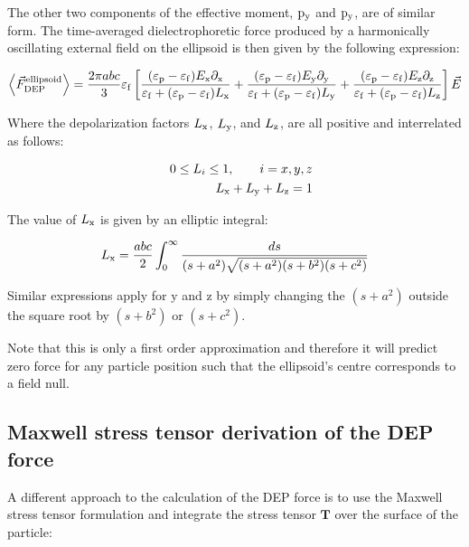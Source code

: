 \documentclass[12pt]{report}
\begin{document}
The other two components of the effective moment, $\rm{p}_{\rm{y}}$ and $\rm{p}_{\rm{y}}$, are of similar form. The time-averaged dielectrophoretic force produced by a harmonically oscillating external field on the ellipsoid is then given by the following expression:

\begin{equation}\left<\vec{F}_{\rm{DEP}}^{\rm{ellipsoid}}\right>=\frac{2\pi abc}{3}\varepsilon_{\rm{f}}\left[\frac{(\varepsilon_{\rm{p}}-\varepsilon_{\rm{f}})E_{\rm{x}}\partial_{\rm{x}}}{\varepsilon_{\rm{f}}+(\varepsilon_{\rm{p}}-\varepsilon_{\rm{f}})L_{\rm{x}}}+\frac{(\varepsilon_{\rm{p}}-\varepsilon_{\rm{f}})E_{\rm{y}}\partial_{\rm{y}}}{\varepsilon_{\rm{f}}+(\varepsilon_{\rm{p}}-\varepsilon_{\rm{f}})L_{\rm{y}}}+\frac{(\varepsilon_{\rm{p}}-\varepsilon_{\rm{f}})E_{\rm{z}}\partial_{\rm{z}}}{\varepsilon_{\rm{f}}+(\varepsilon_{\rm{p}}-\varepsilon_{\rm{f}})L_{\rm{z}}}\right]\vec{E}\end{equation}

Where the depolarization factors $L_{\rm{x}}$, $L_{\rm{y}}$, and $L_{\rm{z}}$, are all positive and interrelated as follows:

\begin{eqnarray}&& 0\leq L_i\leq 1,\qquad i=x,y,z \\ && L_{\rm{x}}+L_{\rm{y}}+L_{\rm{z}}=1\end{eqnarray}

The value of $L_{\rm{x}}$ is given by an elliptic integral:

\begin{equation}L_{\rm{x}}=\frac{abc}{2}\int^\infty_0{\frac{ds}{(s+a^2)\sqrt{(s+a^2)(s+b^2)(s+c^2)}}}\end{equation}

Similar expressions apply for y and z by simply changing the $(s+a^2)$ outside the square root by $(s+b^2)$ or $(s+c^2)$.

Note that this is only a first order approximation and therefore it will predict zero force for any particle position such that the ellipsoid's centre corresponds to a field null.

\subsection{Maxwell stress tensor derivation of the DEP force}
A different approach to the calculation of the DEP force is to use the Maxwell stress tensor formulation and integrate the stress tensor $\mathbf{T}$ over the surface of the particle:
\end{document}
